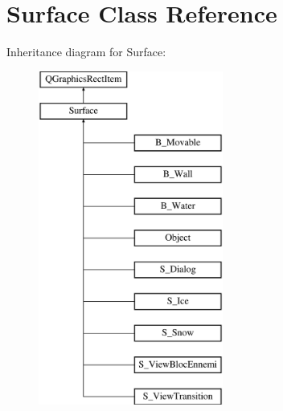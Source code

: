 \hypertarget{class_surface}{}\section{Surface Class Reference}
\label{class_surface}
Inheritance diagram for Surface\+:\begin{figure}[H]
\begin{center}
\leavevmode
\includegraphics[height=11.000000cm]{class_surface}
\end{center}
\end{figure}
